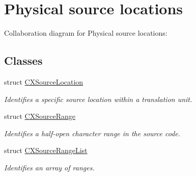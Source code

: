 \hypertarget{group__CINDEX__LOCATIONS}{}\section{Physical source locations}
\label{group__CINDEX__LOCATIONS}
Collaboration diagram for Physical source locations\+:
\subsection*{Classes}
\begin{DoxyCompactItemize}
\item 
struct \hyperlink{structCXSourceLocation}{C\+X\+Source\+Location}
\begin{DoxyCompactList}\small\item\em Identifies a specific source location within a translation unit. \end{DoxyCompactList}\item 
struct \hyperlink{structCXSourceRange}{C\+X\+Source\+Range}
\begin{DoxyCompactList}\small\item\em Identifies a half-\/open character range in the source code. \end{DoxyCompactList}\item 
struct \hyperlink{structCXSourceRangeList}{C\+X\+Source\+Range\+List}
\begin{DoxyCompactList}\small\item\em Identifies an array of ranges. \end{DoxyCompactList}\end{DoxyCompactItemize}
